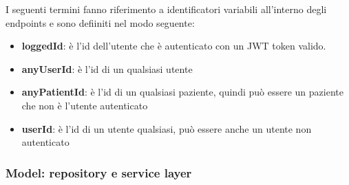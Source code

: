 \documentclass[a4paper]{article}
\begin{document}
\noindent
I seguenti termini fanno riferimento a identificatori variabili all'interno degli endpoints
e sono defiiniti nel modo seguente:
\begin{itemize}
  \item \textbf{loggedId}: è l'id dell'utente che è autenticato
  con un JWT token valido.
  \item \textbf{anyUserId}: è l'id di un qualsiasi utente
  \item \textbf{anyPatientId}: è l'id di un qualsiasi paziente, quindi può 
  essere un paziente che non è l'utente autenticato
  \item \textbf{userId}: è l'id di un utente qualsiasi, può essere anche un utente non autenticato
\end{itemize}

\subsubsection{Model: repository e service layer}
\end{document}
